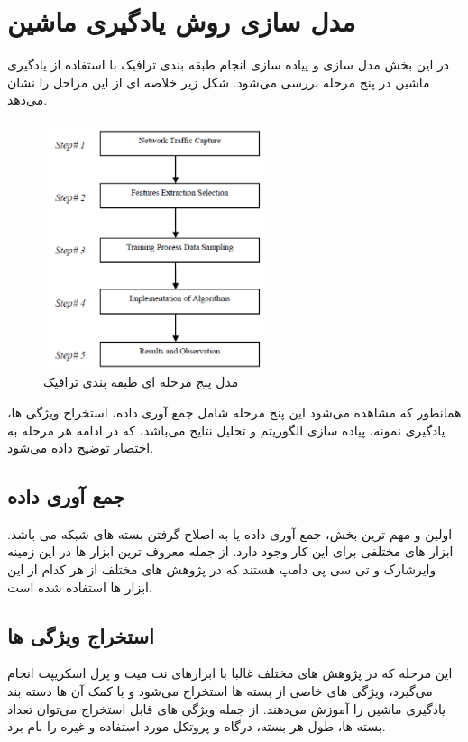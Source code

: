 \chapter{مدل سازی روش یادگیری ماشین}
در این بخش مدل سازی و پیاده سازی انجام طبقه بندی ترافیک با استفاده از یادگیری ماشین در پنج مرحله بررسی می‌شود. شکل زیر خلاصه ای از این مراحل را نشان می‌دهد.

\begin{figure}[!h]
\centerline{\includegraphics[width=0.6\textwidth]{steps.PNG}}
\caption[مدل پنج مرحله ای طبقه بندی ترافیک]{مدل پنج مرحله ای طبقه بندی ترافیک\cite{shafiq2016network}}
\end{figure}

همانطور که مشاهده می‌شود این پنج مرحله شامل جمع آوری داده، استخراج ویژگی ها، یادگیری نمونه، پیاده سازی الگوریتم و تحلیل نتایج می‌باشد، که در ادامه هر مرحله به اختصار توضیح داده می‌شود.

\section{جمع آوری داده}
اولین و مهم ترین بخش، جمع آوری داده یا به اصلاح گرفتن بسته های شبکه می باشد. ابزار های مختلفی برای این کار وجود دارد. از جمله معروف ترین ابزار ها در این زمینه وایرشارک و تی سی پی دامپ هستند که در پژوهش های مختلف از هر کدام از این ابزار ها استفاده شده است.

\section{استخراج ویژگی ها}
این مرحله که در پژوهش های مختلف غالبا با ابزارهای نت میت و پرل اسکریپت انجام می‌گیرد، ویژگی های خاصی از بسته ها استخراج می‌شود و با کمک آن ها دسته بند یادگیری ماشین را آموزش می‌دهند. از جمله ویژگی های قابل استخراج می‌توان تعداد بسته ها، طول هر بسته، درگاه و پروتکل مورد استفاده و غیره را نام برد. 

